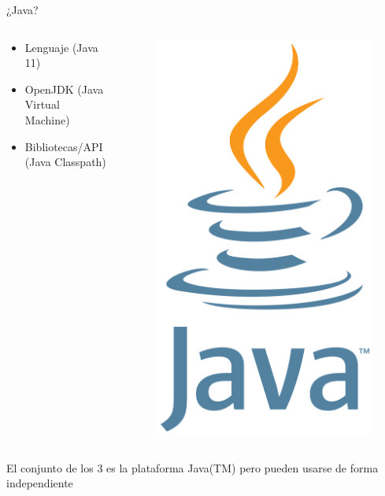 \documentclass[aspectratio=169]{beamer}
\begin{document}
\begin{frame}[fragile]{¿Java?}
\begin{columns}
    \begin{column}{0.5\textwidth}
        \begin{itemize}
            \item Lenguaje (Java 11)
            \item OpenJDK (Java Virtual Machine)
            \item Bibliotecas/API (Java Classpath)
        \end{itemize}
    \end{column}
    \begin{column}{0.5\textwidth}  %
        \begin{figure}
            \centering
            \includegraphics[width=0.4\linewidth]{Images/java}
        \end{figure}
    \end{column}
\end{columns}
    
    
    
El conjunto de los 3 es la plataforma Java(TM) pero pueden usarse de forma independiente
\end{frame}
\end{document}
